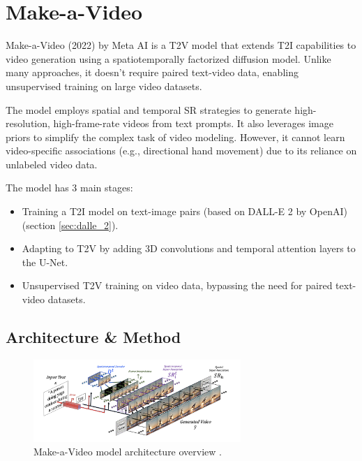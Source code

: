 \section{Make-a-Video}
\label{sec:make_a_video}


Make-a-Video \cite{make_a_video} (2022) by Meta AI is a T2V model that extends T2I capabilities to video generation using a spatiotemporally factorized diffusion model. Unlike many approaches, it doesn't require paired text-video data, enabling unsupervised training on large video datasets.

The model employs spatial and temporal SR strategies to generate high-resolution, high-frame-rate videos from text prompts. It also leverages image priors to simplify the complex task of video modeling. However, it cannot learn video-specific associations (e.g., directional hand movement) due to its reliance on unlabeled video data.

The model has 3 main stages:

\begin{itemize}
    \item Training a T2I model on text-image pairs (based on DALL-E 2 \cite{dalle_2} by OpenAI) (section \ref{sec:dalle_2}).
    \item Adapting to T2V by adding 3D convolutions and temporal attention layers to the U-Net.
    \item Unsupervised T2V training on video data, bypassing the need for paired text-video datasets.
\end{itemize}








\subsection{Architecture \& Method}

\begin{figure}
    \centering
    \includegraphics[width=0.7\textwidth]{images/make_a_video/overview.png}
    \caption{Make-a-Video model architecture overview \cite{make_a_video}.}
    \label{fig:make_a_video_overview}
\end{figure}

